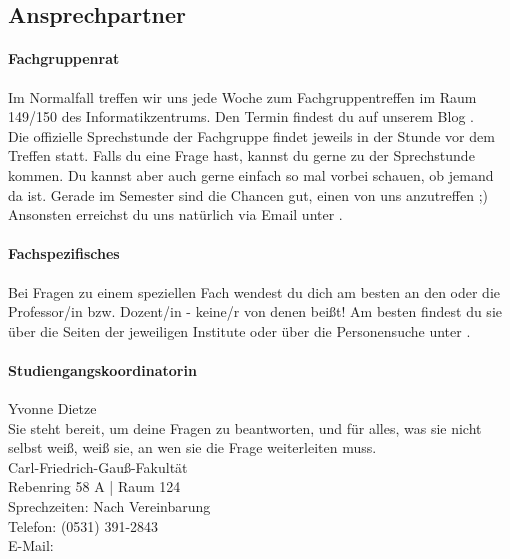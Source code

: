 
\subsection{Ansprechpartner}

	\paragraph{Fachgruppenrat}
		Im Normalfall treffen wir uns jede Woche zum Fachgruppentreffen im Raum 149/150 des Informatikzentrums. Den  Termin findest du auf unserem Blog \fginfoUrl. 
		\\
		Die offizielle Sprechstunde der Fachgruppe findet jeweils in der Stunde vor dem Treffen statt. Falls du eine Frage hast, kannst du gerne zu der Sprechstunde kommen. Du kannst aber auch gerne einfach so mal vorbei schauen, ob jemand da ist. Gerade im Semester sind die Chancen gut, einen von uns anzutreffen ;)
		\\
		Ansonsten erreichst du uns natürlich via Email unter . 

	\paragraph{Fachspezifisches}
		Bei Fragen zu einem speziellen Fach wendest du dich am
		besten an den oder die Professor/in bzw. Dozent/in -
		keine/r von denen beißt! Am besten findest du sie über die Seiten der jeweiligen Institute 
		oder über die Personensuche unter .

	\noindent\begin{minipage}{\columnwidth}
	\paragraph{Studiengangskoordinatorin}
	Yvonne Dietze \\
	Sie steht bereit, um deine Fragen zu beantworten, und für alles, was sie nicht selbst weiß, weiß sie, an wen sie die Frage weiterleiten muss.\\
	Carl-Friedrich-Gauß-Fakultät\\
	Rebenring 58 A | Raum 124\\
	Sprechzeiten: Nach  Vereinbarung\\
	Telefon: (0531) 391-2843\\
	E-Mail: 
	\end{minipage}

